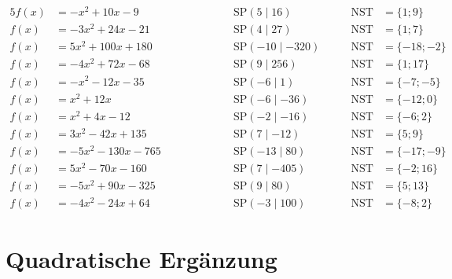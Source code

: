 \documentclass
[
  draft    = true,
  fontsize = 11pt,
  parskip  = half-,
  BCOR     = 0pt,
  DIV      = 11
]
{scrartcl}
\begin{document}
\begin{alignat*}{5}
  f(x)&=-x^{2}+10x-9 \qquad&\qquad \quad&\text{SP}(5\mid16) \quad&\quad \text{NST}&=\{1;9\} \\[0.5ex]
  f(x)&=-3x^{2}+24x-21 \qquad&\qquad \quad&\text{SP}(4\mid27) \quad&\quad \text{NST}&=\{1;7\} \\[0.5ex]
  f(x)&=5x^{2}+100x+180 \qquad&\qquad \quad&\text{SP}(-10\mid-320) \quad&\quad \text{NST}&=\{-18;-2\} \\[0.5ex]
  f(x)&=-4x^{2}+72x-68 \qquad&\qquad \quad&\text{SP}(9\mid256) \quad&\quad \text{NST}&=\{1;17\} \\[0.5ex]
  f(x)&=-x^{2}-12x-35 \qquad&\qquad \quad&\text{SP}(-6\mid1) \quad&\quad \text{NST}&=\{-7;-5\} \\[0.5ex]
  f(x)&=x^{2}+12x \qquad&\qquad \quad&\text{SP}(-6\mid-36) \quad&\quad \text{NST}&=\{-12;0\} \\[0.5ex]
  f(x)&=x^{2}+4x-12 \qquad&\qquad \quad&\text{SP}(-2\mid-16) \quad&\quad \text{NST}&=\{-6;2\} \\[0.5ex]
  f(x)&=3x^{2}-42x+135 \qquad&\qquad \quad&\text{SP}(7\mid-12) \quad&\quad \text{NST}&=\{5;9\} \\[0.5ex]
  f(x)&=-5x^{2}-130x-765 \qquad&\qquad \quad&\text{SP}(-13\mid80) \quad&\quad \text{NST}&=\{-17;-9\} \\[0.5ex]
  f(x)&=5x^{2}-70x-160 \qquad&\qquad \quad&\text{SP}(7\mid-405) \quad&\quad \text{NST}&=\{-2;16\} \\[0.5ex]
  f(x)&=-5x^{2}+90x-325 \qquad&\qquad \quad&\text{SP}(9\mid80) \quad&\quad \text{NST}&=\{5;13\} \\[0.5ex]
  f(x)&=-4x^{2}-24x+64 \qquad&\qquad \quad&\text{SP}(-3\mid100) \quad&\quad \text{NST}&=\{-8;2\}
\end{alignat*}

\clearpage
\section*{Quadratische Ergänzung}
\end{document}
